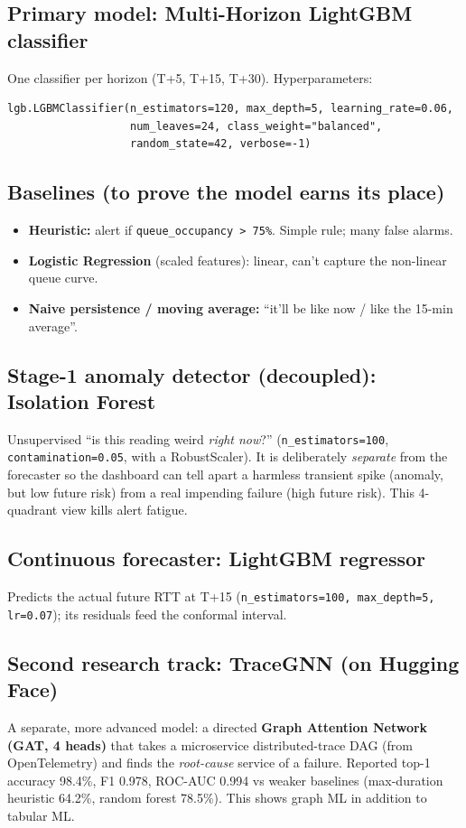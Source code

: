 \documentclass[11pt,a4paper]{article}
\begin{document}
\subsection{Primary model: Multi-Horizon LightGBM classifier}
One classifier per horizon (T+5, T+15, T+30). Hyperparameters:
\begin{lstlisting}
lgb.LGBMClassifier(n_estimators=120, max_depth=5, learning_rate=0.06,
                   num_leaves=24, class_weight="balanced",
                   random_state=42, verbose=-1)
\end{lstlisting}

\subsection{Baselines (to prove the model earns its place)}
\begin{itemize}
  \item \textbf{Heuristic:} alert if \texttt{queue\_occupancy > 75\%}. Simple rule; many false alarms.
  \item \textbf{Logistic Regression} (scaled features): linear, can't capture the non-linear queue curve.
  \item \textbf{Naive persistence / moving average:} ``it'll be like now / like the 15-min average''.
\end{itemize}

\subsection{Stage-1 anomaly detector (decoupled): Isolation Forest}
Unsupervised ``is this reading weird \emph{right now}?'' (\texttt{n\_estimators=100},
\texttt{contamination=0.05}, with a RobustScaler). It is deliberately \emph{separate} from the forecaster so
the dashboard can tell apart a harmless transient spike (anomaly, but low future risk) from a real impending
failure (high future risk). This 4-quadrant view kills alert fatigue.

\subsection{Continuous forecaster: LightGBM regressor}
Predicts the actual future RTT at T+15 (\texttt{n\_estimators=100, max\_depth=5, lr=0.07}); its residuals feed
the conformal interval.

\subsection{Second research track: TraceGNN (on Hugging Face)}
A separate, more advanced model: a directed \textbf{Graph Attention Network (GAT, 4 heads)} that takes a
microservice distributed-trace DAG (from OpenTelemetry) and finds the \emph{root-cause} service of a failure.
Reported top-1 accuracy 98.4\%, F1 0.978, ROC-AUC 0.994 vs weaker baselines (max-duration heuristic 64.2\%,
random forest 78.5\%). This shows graph ML in addition to tabular ML.
\end{document}
